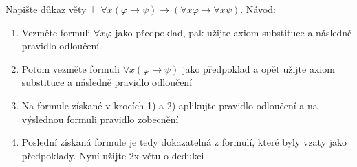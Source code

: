 Napište důkaz věty $\vdash \forall x (\varphi \rightarrow \psi) \rightarrow
(\forall x \varphi \rightarrow \forall x \psi)$. Návod:

\begin{enumerate}
  \item Vezměte formuli $\forall x \varphi$ jako předpoklad, pak užijte axiom substituce a
následně pravidlo odloučení
  \item Potom vezměte formuli $\forall x (\varphi \rightarrow \psi)$ jako předpoklad a opět užijte axiom
substituce a následně pravidlo odloučení
  \item Na formule získané v krocích 1) a 2) aplikujte pravidlo odloučení a na
výslednou formuli pravidlo zobecnění
  \item Poslední získaná formule je tedy dokazatelná z formulí, které byly vzaty
jako předpoklady. Nyní užijte 2x větu o dedukci
\end{enumerate}
